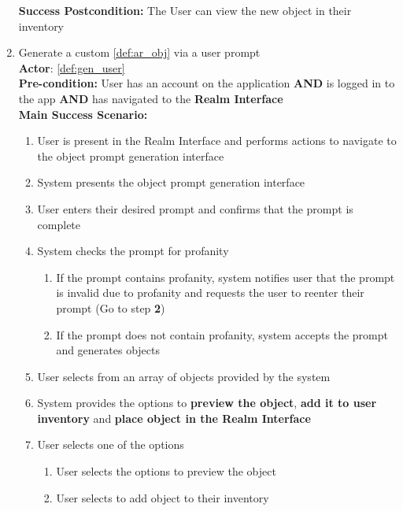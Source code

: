 \documentclass{article}
\begin{document}
\begin{enumerate}[label=\textbf{UC\arabic*}]
\begin{itemize}
          \end{itemize}
          \textbf{Success Postcondition:} The User can view the new object in their inventory

    \item \label{uc:6} Generate a custom \ref{def:ar_obj} via a user prompt \\
          \textbf{Actor}: \ref{def:gen_user} \\
          \textbf{Pre-condition:} User has an account on the application \textbf{AND} is logged in to the app \textbf{AND} has navigated to the \textbf{Realm Interface} \\

          \textbf{Main Success Scenario:}
          \begin{enumerate}[label=\textbf{\arabic*.}]
              \item User is present in the Realm Interface and performs actions to navigate to the object prompt generation interface
              \item System presents the object prompt generation interface
              \item User enters their desired prompt and confirms that the prompt is complete
              \item System checks the prompt for profanity
                    \begin{enumerate}[label=(\alph*)]
                        \item If the prompt contains profanity, system notifies user that the prompt is invalid due to profanity and requests the user to reenter their prompt (Go to step \textbf{2})
                        \item If the prompt does not contain profanity, system accepts the prompt and generates objects
                    \end{enumerate}
              \item User selects from an array of objects provided by the system
              \item System provides the options to \textbf{preview the object}, \textbf{add it to user inventory} and \textbf{place object in the Realm Interface}
              \item User selects one of the options
                    \begin{enumerate}[label=(\alph*)]
                        \item User selects the options to preview the object
                        \item User selects to add object to their inventory

\end{enumerate}
\end{enumerate}
\end{enumerate}
\end{document}
